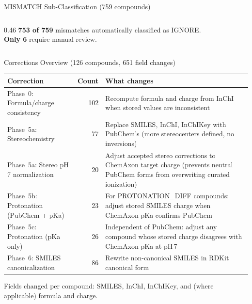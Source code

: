 \documentclass[aspectratio=169,11pt]{beamer}
\begin{document}
\begin{frame}{MISMATCH Sub-Classification (759 compounds)}
\begin{columns}[T]
\begin{column}{0.46\textwidth}
\medskip
\textbf{753 of 759} mismatches automatically
classified as IGNORE.\\[2pt]
\textbf{Only 6} require manual review.
\end{column}
\end{columns}

\end{frame}

\begin{frame}{Corrections Overview (126 compounds, 651 field changes)}

\vspace{-4pt}
\footnotesize
\begin{tabular}{p{3.2cm}rp{8.2cm}}
\toprule
\textbf{Correction} & \textbf{Count} & \textbf{What changes} \\
\midrule
Phase~0: Formula/charge consistency & 102 &
  Recompute formula and charge from InChI when
  stored values are inconsistent \\[2pt]
Phase~5a: Stereochemistry & 77 &
  Replace SMILES, InChI, InChIKey with PubChem's
  (more stereocenters defined, no inversions) \\[2pt]
Phase~5a: Stereo pH\,7 normalization & 20 &
  Adjust accepted stereo corrections to ChemAxon target
  charge (prevents neutral PubChem forms from overwriting
  curated ionization) \\[2pt]
Phase~5b: Protonation (PubChem + pKa) & 23 &
  For PROTONATION\_DIFF compounds: adjust stored SMILES
  charge when ChemAxon pKa confirms PubChem \\[2pt]
Phase~5c: Protonation (pKa only) & 26 &
  Independent of PubChem: adjust any compound whose
  stored charge disagrees with ChemAxon pKa at pH\,7 \\[2pt]
Phase~6: SMILES canonicalization & 86 &
  Rewrite non-canonical SMILES in RDKit canonical form \\
\bottomrule
\end{tabular}

\smallskip
Fields changed per compound: SMILES, InChI, InChIKey, and
(where applicable) formula and charge.

\end{frame}
\end{document}
